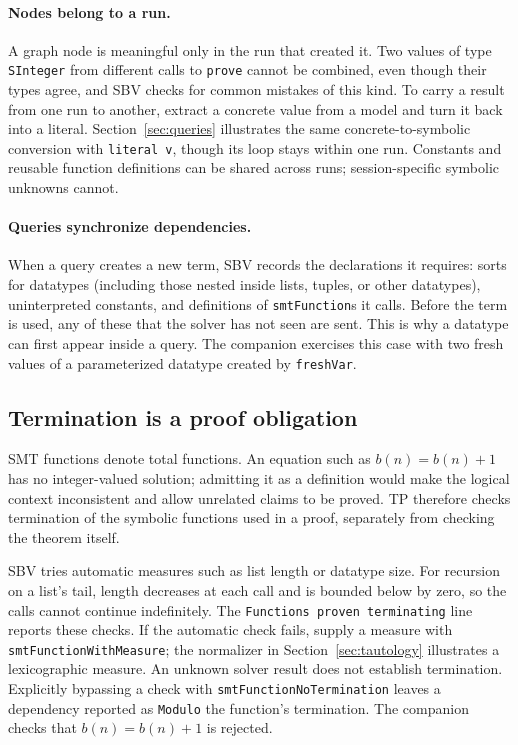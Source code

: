 \documentclass[acmsmall,screen,review,anonymous,nonacm]{acmart}
\newcommand{\code}[1]{\texttt{#1}}
\newcounter{exercise}
\begin{document}
\paragraph{Nodes belong to a run.}
A graph node is meaningful only in the run that created it. Two values of type
\code{SInteger} from different calls to \code{prove} cannot be combined, even
though their types agree, and SBV checks for common mistakes of this kind. To
carry a result from one run to another, extract a concrete value from a model
and turn it back into a literal. Section~\ref{sec:queries} illustrates the same
concrete-to-symbolic conversion with \code{literal v}, though its loop stays
within one run. Constants and reusable function definitions can be shared
across runs; session-specific symbolic unknowns cannot.

\paragraph{Queries synchronize dependencies.}
When a query creates a new term, SBV records the declarations it requires: sorts
for datatypes (including those nested inside lists, tuples, or other datatypes),
uninterpreted constants, and definitions of \code{smtFunction}s it calls. Before
the term is used, any of these that the solver has not seen are sent. This is why
a datatype can first appear inside a query. The companion exercises this case
with two fresh values of a parameterized datatype created by \code{freshVar}.

\subsection{Termination is a proof obligation}
\label{sec:termination}

SMT functions denote total functions. An equation such as $b(n)=b(n)+1$ has
no integer-valued solution; admitting it as a definition would make the logical
context inconsistent and allow unrelated claims to be proved. TP therefore
checks termination of the symbolic functions used in a proof, separately from
checking the theorem itself.

SBV tries automatic measures such as list length or datatype size. For recursion
on a list's tail, length decreases at each call and is bounded below by zero,
so the calls cannot continue indefinitely. The
\code{Functions proven terminating} line reports these checks. If the automatic
check fails, supply a measure with \code{smtFunctionWithMeasure}; the normalizer
in Section~\ref{sec:tautology} illustrates a lexicographic measure. An unknown
solver result does not establish termination. Explicitly bypassing a check with
\code{smtFunctionNoTermination} leaves a dependency reported as \code{Modulo}
the function's termination. The companion checks that $b(n)=b(n)+1$ is rejected.
\end{document}
